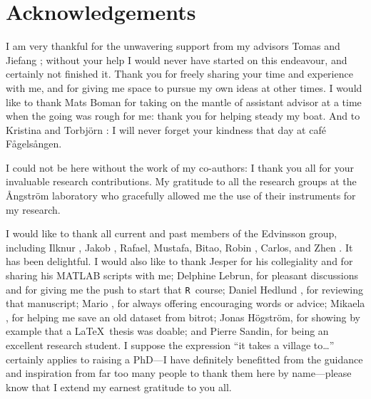 \documentclass[webedition,openright,titles,swedish,english]{LuaUUThesis}\usepackage[]{graphicx}\usepackage[]{xcolor}
\newcommand{\R}{\texttt{R}}
\begin{document}
%

\backmatter


%

\chapter{Acknowledgements}
\label{ch:acknowledgements}

\bgroup
\setlength{\parindent}{0pt}
\setlength{\parskip}{1ex plus 0.5ex minus 0.2ex}


I am very thankful for the unwavering support from my advisors
Tomas  and
Jiefang ;
without your help I would never have started on this endeavour, and certainly
not finished it.
Thank you for freely sharing your time and experience with me, and
for giving me space to pursue my own ideas at other times.
I would like to thank Mats Boman for taking on the mantle of assistant advisor
at a time when the going was rough for me: thank you for helping steady my boat.
And to Kristina  and Torbjörn :
I will never forget your kindness that day at café Fågelsången.


I could not be here without the work of my co-authors: I thank you all for your
invaluable research contributions.
My gratitude to all the research groups at the Ångström laboratory who gracefully
allowed me the use of their instruments for my research.

I would like to thank all current and past members of the Edvinsson group,
including Ilknur , Jakob ,
Rafael, Mustafa, Bitao, Robin , Carlos, and
Zhen . It has been delightful.
I would also like to thank Jesper 
for his collegiality and for sharing his MATLAB scripts with me;
Delphine Lebrun, for pleasant discussions and for giving me the push to start that \R\ course;
Daniel Hedlund , for reviewing that manuscript;
Mario , for always offering encouraging words or advice;
Mikaela , for helping me save an old dataset from bitrot;
Jonas Högström, for showing by example that a \LaTeX\ thesis was doable;
and Pierre Sandin, for being an excellent research student.
%
I suppose the expression \enquote{it takes a village to\ldots} certainly applies to raising
a PhD---I have definitely benefitted from the guidance and inspiration from far
too many people to thank them here by name---please know that I extend my
earnest gratitude to you all.
\end{document}
